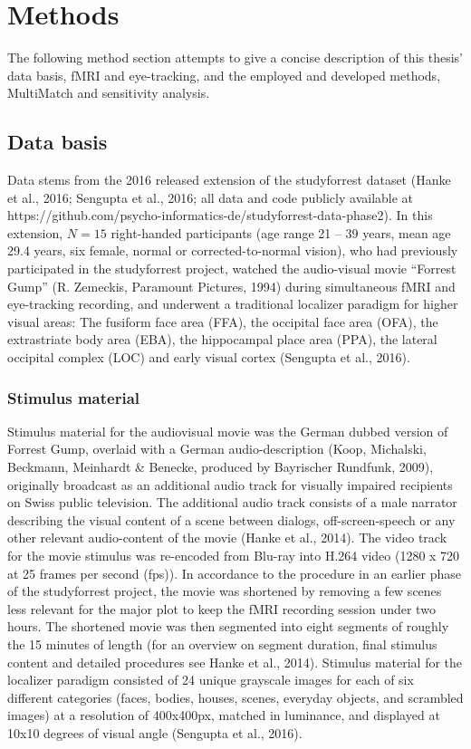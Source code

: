 \documentclass[a4paper, 11pt]{scrreprt}
\begin{document}
\chapter{Methods}\label{par:methods}

The following method section attempts to give a concise description of this thesis' data basis, fMRI and eye-tracking, and the employed and developed methods, MultiMatch and sensitivity analysis. 

\section{Data basis}

Data stems from the 2016 released extension of the studyforrest dataset (Hanke et al., 2016; Sengupta et al., 2016; all data and code publicly available at https://github.com/psycho-informatics-de/studyforrest-data-phase2). In this extension, $N = 15$ right-handed participants (age range 21 – 39 years, mean age 29.4 years, six female, normal or corrected-to-normal vision), who had previously participated in the studyforrest project, watched the audio-visual movie “Forrest Gump” (R. Zemeckis, Paramount Pictures, 1994) during simultaneous fMRI and eye-tracking recording, and underwent a traditional localizer paradigm for higher visual areas: The fusiform face area (FFA), the occipital face area (OFA), the extrastriate body area (EBA), the hippocampal place area (PPA), the lateral occipital complex (LOC) and early visual cortex (Sengupta et al., 2016).

\subsection{Stimulus material}

Stimulus material for the audiovisual movie was the German dubbed version of Forrest Gump, overlaid with a German audio-description (Koop, Michalski, Beckmann, Meinhardt \& Benecke, produced by Bayrischer Rundfunk, 2009), originally broadcast as an additional audio track for visually impaired recipients on Swiss public television. The additional audio track consists of a male narrator describing the visual content of a scene between dialogs, off-screen-speech or any other relevant audio-content of the movie (Hanke et al., 2014). The video track for the movie stimulus was re-encoded from Blu-ray into H.264 video (1280 x 720 at 25 frames per second (fps)). In accordance to the procedure in an earlier phase of the studyforrest project, the movie was shortened by removing a few scenes less relevant for the major plot to keep the fMRI recording session under two hours. The shortened movie was then segmented into eight segments of roughly the 15 minutes of length (for an overview on segment duration, final stimulus content and detailed procedures see Hanke et al., 2014). Stimulus material for the localizer paradigm consisted of 24 unique grayscale images for each of six different categories (faces, bodies, houses, scenes, everyday objects, and scrambled images) at a resolution of 400x400px, matched in luminance, and displayed at 10x10 degrees of visual angle (Sengupta et al., 2016).
\end{document}
